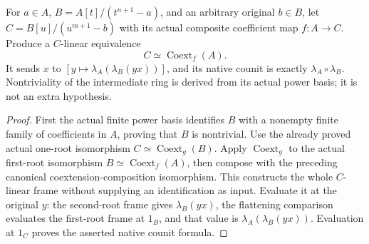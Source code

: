 \begin{theorem}
\label{thm:kn-nadel-two-root-tower-duality}
\leanok
For $a\in A$, $B=A[t]/(t^{n+1}-a)$, and an arbitrary original
$b\in B$, let $C=B[u]/(u^{m+1}-b)$ with its actual composite
coefficient map $f:A\to C$.  Produce a $C$-linear equivalence
\[
 C\simeq\operatorname{Coext}_f(A).
\]
It sends $x$ to $[y\mapsto\lambda_A(\lambda_B(yx))]$, and its native
counit is exactly $\lambda_A\circ\lambda_B$.  Nontriviality of the
intermediate ring is derived from its actual power basis; it is
not an extra hypothesis.
\end{theorem}
\begin{proof}
First the actual finite power basis identifies $B$ with a nonempty
finite family of coefficients in $A$, proving that $B$ is nontrivial.
Use the already proved actual one-root isomorphism
$C\simeq\operatorname{Coext}_g(B)$.  Apply $\operatorname{Coext}_g$
to the actual first-root isomorphism
$B\simeq\operatorname{Coext}_f(A)$, then compose with the preceding
canonical coextension-composition isomorphism.  This constructs the
whole $C$-linear frame without supplying an identification as input.
Evaluate it at the original $y$: the second-root frame gives
$\lambda_B(yx)$, the flattening comparison evaluates the first-root
frame at $1_B$, and that value is $\lambda_A(\lambda_B(yx))$.
Evaluation at $1_C$ proves the asserted native counit formula.
\end{proof}

